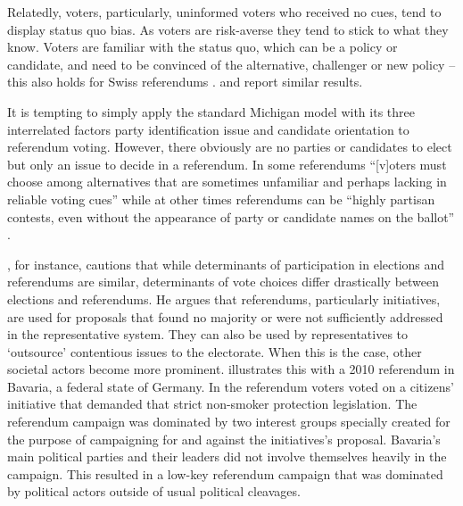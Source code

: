 \documentclass[11pt,a4paper]{article}\usepackage[]{graphicx}\usepackage[]{color}
\begin{document}
    Relatedly, voters, particularly, uninformed voters who received no cues, tend to display status quo bias. As voters are risk-averse they tend to stick to what they know. Voters are familiar with the status quo, which can be a policy or candidate, and need to be convinced of the alternative, challenger or new policy -- this also holds for Swiss referendums \citep{brunetti_status_1997}. %
    \citet{buri_grunde_1993} and \citet{christin_interests_2002} report similar results. 
    
    It is tempting to simply apply the standard Michigan model with its three interrelated factors party identification issue and candidate orientation to referendum voting. However, there obviously are no parties or candidates to elect but only an issue to decide in a referendum. In some referendums ``[v]oters must choose among alternatives that are sometimes unfamiliar and perhaps lacking in reliable voting cues'' while at other times referendums can be ``highly partisan contests, even without the appearance of party or candidate names on the ballot'' \citep[711]{leduc_opinion_2002}. 
    
    \citet{schoen_wahlen_2012}, for instance, cautions that while determinants of participation in elections and referendums are similar, determinants of vote choices differ drastically between elections and referendums. He argues that referendums, particularly initiatives, are used for proposals that found no majority or were not sufficiently addressed in the representative system. They can also be used by representatives to `outsource' contentious issues to the electorate. When this is the case, other societal actors become more prominent. \citet{schoen_wahlen_2012} illustrates this with a 2010 referendum in Bavaria, a federal state of Germany. In the referendum voters voted on a citizens' initiative that demanded that strict non-smoker protection legislation. The referendum campaign was dominated by two interest groups specially created for the purpose of campaigning for and against the initiatives's proposal. Bavaria's main political parties and their leaders did not involve themselves heavily in the campaign. This resulted in a low-key referendum campaign that was dominated by political actors outside of usual political cleavages. 
    
\end{document}
